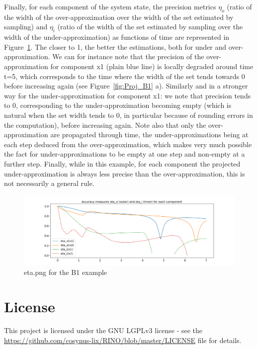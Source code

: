 \documentclass{article}
\begin{document}
Finally, for each component of the system state, the precision metrics $\eta_o$ (ratio of the width of the over-approximation over the  width of the set estimated by sampling) and $\eta_i$	 (ratio of the  width of the set estimated by sampling over the width of the under-approximation) as functions of time are represented in Figure~\ref{fig:metrics_B1}.  The closer to 1, the better the estimations, both for under and over-approximation.  We can for instance note that the precision of the over-approximation for component x1 (plain blue line) is locally degraded around time t=5, which corresponds to the time where the width of the set tends towards 0 before increasing again (see Figure~\ref{fig:Proj_B1} a).  Similarly and in a stronger way for the under-approximation for component x1: we note that precision tends to 0, corresponding to the under-approximation becoming empty (which is natural when the set width tends to 0, in particular because of rounding errors in the computation), before increasing again. Note also that only the over-approximation are propagated through time, the under-approximations being at each step deduced from the over-approximation, which makes very much possible the fact for under-approximations to be empty at one step and non-empty at a further step.  Finally, while in this example, for each component the projected under-approximation is always less precise than the over-approximation, this is not necessarily a general rule. 
\begin{figure}[htbp]
\centering
  \includegraphics[width=.99\linewidth]{eta_B1sig.png}
\caption{ eta.png for the B1 example}
\label{fig:metrics_B1}
\end{figure}
\section{License}

This project is licensed under the GNU LGPLv3 license - see the \url{https://github.com/cosynus-lix/RINO/blob/master/LICENSE} file for details.








\end{document}
